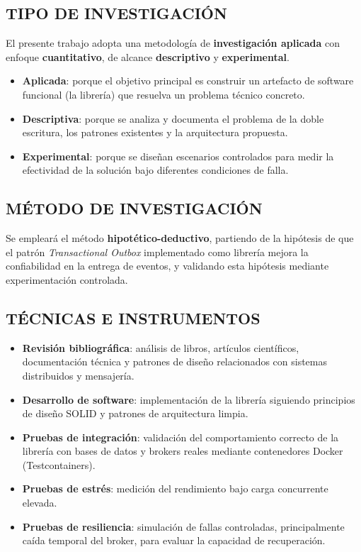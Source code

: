 \subsection{TIPO DE INVESTIGACIÓN}

El presente trabajo adopta una metodología de \textbf{investigación aplicada} con enfoque \textbf{cuantitativo}, de alcance \textbf{descriptivo} y \textbf{experimental}.

\begin{itemize}
    \item \textbf{Aplicada}: porque el objetivo principal es construir un artefacto de software funcional (la librería) que resuelva un problema técnico concreto.
    \item \textbf{Descriptiva}: porque se analiza y documenta el problema de la doble escritura, los patrones existentes y la arquitectura propuesta.
    \item \textbf{Experimental}: porque se diseñan escenarios controlados para medir la efectividad de la solución bajo diferentes condiciones de falla.
\end{itemize}

\subsection{MÉTODO DE INVESTIGACIÓN}

Se empleará el método \textbf{hipotético-deductivo}, partiendo de la hipótesis de que el patrón \textit{Transactional Outbox} implementado como librería mejora la confiabilidad en la entrega de eventos, y validando esta hipótesis mediante experimentación controlada.

\subsection{TÉCNICAS E INSTRUMENTOS}

\begin{itemize}
    \item \textbf{Revisión bibliográfica}: análisis de libros, artículos científicos, documentación técnica y patrones de diseño relacionados con sistemas distribuidos y mensajería.
    \item \textbf{Desarrollo de software}: implementación de la librería siguiendo principios de diseño SOLID y patrones de arquitectura limpia.
    \item \textbf{Pruebas de integración}: validación del comportamiento correcto de la librería con bases de datos y brokers reales mediante contenedores Docker (Testcontainers).
    \item \textbf{Pruebas de estrés}: medición del rendimiento bajo carga concurrente elevada.
    \item \textbf{Pruebas de resiliencia}: simulación de fallas controladas, principalmente caída temporal del broker, para evaluar la capacidad de recuperación.
\end{itemize}

